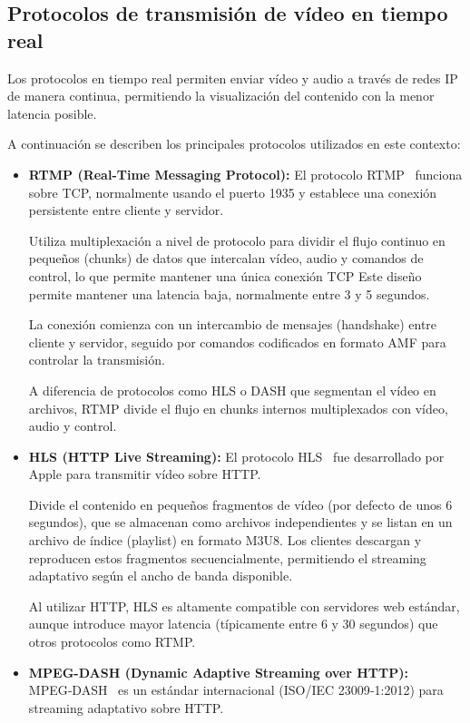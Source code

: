 \subsection{Protocolos de transmisión de vídeo en tiempo real}
Los protocolos en tiempo real permiten enviar vídeo y audio a través de redes IP de manera continua,
permitiendo la visualización del contenido con la menor latencia posible.

A continuación se describen los principales protocolos utilizados en este contexto:

\begin{itemize}
    \item \textbf{RTMP (Real-Time Messaging Protocol):} El protocolo RTMP~\citep{rtmp_adobe} funciona sobre TCP, normalmente usando el puerto 1935 y establece una conexión persistente entre cliente y servidor.

    Utiliza multiplexación a nivel de protocolo para dividir el flujo continuo en pequeños (chunks) de datos que intercalan vídeo, audio y comandos de control,
    lo que permite mantener una única conexión TCP
    Este diseño permite mantener una latencia baja, normalmente entre 3 y 5 segundos.

    La conexión comienza con un intercambio de mensajes (handshake) entre cliente y servidor, seguido por comandos codificados en formato AMF para controlar la transmisión.

    A diferencia de protocolos como HLS o DASH que segmentan el vídeo en archivos, RTMP divide el flujo en chunks internos multiplexados con vídeo, audio y control.

    \item \textbf{HLS (HTTP Live Streaming):} El protocolo HLS~\citep{hls_ietf} fue desarrollado por Apple para transmitir vídeo sobre HTTP.

    Divide el contenido en pequeños fragmentos de vídeo (por defecto de unos 6 segundos), que se almacenan como archivos independientes y se listan en un archivo de índice (playlist) en formato M3U8.
    Los clientes descargan y reproducen estos fragmentos secuencialmente, permitiendo el streaming adaptativo según el ancho de banda disponible.

    Al utilizar HTTP, HLS es altamente compatible con servidores web estándar, aunque introduce mayor latencia (típicamente entre 6 y 30 segundos) que otros protocolos como RTMP.

    \item \textbf{MPEG-DASH (Dynamic Adaptive Streaming over HTTP):} MPEG‑DASH~\citep{dash_iso} es un estándar internacional (ISO/IEC 23009‑1:2012) para streaming adaptativo sobre HTTP.


\end{itemize}
